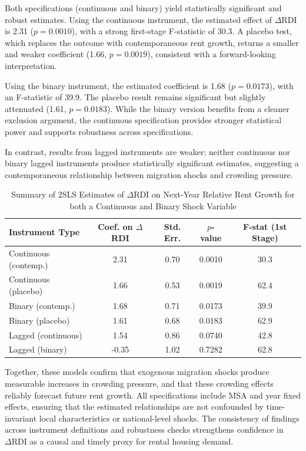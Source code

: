 \documentclass[APA,Times1COL]{WileyNJDv5} %
\begin{document}
Both specifications (continuous and binary) yield statistically significant and robust estimates. Using the continuous instrument, the estimated effect of \(\Delta \text{RDI}\) is 2.31 (\(p = 0.0010\)), with a strong first-stage F-statistic of 30.3. A placebo test, which replaces the outcome with contemporaneous rent growth, returns a smaller and weaker coefficient (1.66, \(p = 0.0019\)), consistent with a forward-looking interpretation.

Using the binary instrument, the estimated coefficient is 1.68 (\(p = 0.0173\)), with an F-statistic of 39.9. The placebo result remains significant but slightly attenuated (1.61, \(p = 0.0183\)). While the binary version benefits from a cleaner exclusion argument, the continuous specification provides stronger statistical power and supports robustness across specifications.

In contrast, results from lagged instruments are weaker; neither continuous nor binary lagged instruments produce statistically significant estimates, suggesting a contemporaneous relationship between migration shocks and crowding pressure.

\begin{table}[h]
	\centering
	\caption{Summary of 2SLS Estimates of $\Delta \text{RDI}$ on Next-Year Relative Rent Growth for both a Continuous and Binary Shock Variable}
	\label{tab:iv-summary}
	\begin{tabular}{lcccc}
		\toprule
		Instrument Type & Coef. on $\Delta$RDI & Std. Err. & $p$-value & F-stat (1st Stage) \\
		\midrule
		Continuous (contemp.) & 2.31 & 0.70 & 0.0010 & 30.3 \\
		Continuous (placebo)  & 1.66 & 0.53 & 0.0019 & 62.4 \\
		Binary (contemp.)     & 1.68 & 0.71 & 0.0173 & 39.9 \\
		Binary (placebo)      & 1.61 & 0.68 & 0.0183 & 62.9 \\
		Lagged (continuous)   & 1.54 & 0.86 & 0.0740 & 42.8 \\
		Lagged (binary)       & -0.35 & 1.02 & 0.7282 & 62.8 \\
		\bottomrule
	\end{tabular}
\end{table}

Together, these models confirm that exogenous migration shocks produce measurable increases in crowding pressure, and that these crowding effects reliably forecast future rent growth. All specifications include MSA and year fixed effects, ensuring that the estimated relationships are not confounded by time-invariant local characteristics or national-level shocks. The consistency of findings across instrument definitions and robustness checks strengthens confidence in \(\Delta \text{RDI}\) as a causal and timely proxy for rental housing demand.
\end{document}
